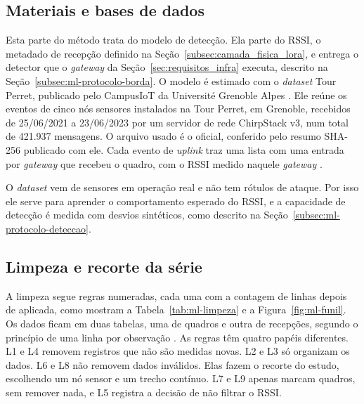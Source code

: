 \subsection{Materiais e bases de dados}
\label{subsec:ml-dataset}

Esta parte do método trata do modelo de detecção. Ela parte do RSSI, o
metadado de recepção definido na Seção~\ref{subsec:camada_fisica_lora}, e
entrega o detector que o \textit{gateway} da Seção~\ref{sec:requisitos_infra}
executa, descrito na Seção~\ref{subsec:ml-protocolo-borda}. O modelo é estimado
com o \textit{dataset} Tour Perret,
publicado pelo CampusIoT da Université Grenoble Alpes \cite{tourperret_dataset}.
Ele reúne os eventos de cinco nós sensores instalados na Tour Perret, em
Grenoble, recebidos de 25/06/2021 a 23/06/2023 por um servidor de rede
ChirpStack v3, num total de 421.937 mensagens. O arquivo usado é o oficial,
conferido pelo resumo SHA-256 publicado com ele. Cada evento de
\textit{uplink} traz uma lista com uma entrada por \textit{gateway} que recebeu
o quadro, com o RSSI medido naquele \textit{gateway} \cite{brocaarintegration}.

O \textit{dataset} vem de sensores em operação real e não tem rótulos de ataque.
Por isso ele serve para aprender o comportamento esperado do RSSI, e a
capacidade de detecção é medida com desvios sintéticos, como descrito na
Seção~\ref{subsec:ml-protocolo-deteccao}.

\subsection{Limpeza e recorte da série}
\label{subsec:ml-limpeza}
\label{sec:selecao_variaveis}

A limpeza segue regras numeradas, cada uma com a contagem de linhas depois de
aplicada, como mostram a Tabela~\ref{tab:ml-limpeza} e a
Figura~\ref{fig:ml-funil}. Os dados ficam em duas tabelas, uma de quadros e
outra de recepções, segundo o princípio de uma linha por observação
\cite{wickham2014tidy}. As regras têm quatro papéis diferentes. L1 e L4 removem
registros que não são medidas novas. L2 e L3 só organizam os dados. L6 e L8 não
removem dados inválidos. Elas fazem o recorte do estudo, escolhendo um nó
sensor e um trecho contínuo. L7 e L9 apenas marcam quadros, sem remover nada, e
L5 registra a decisão de não filtrar o RSSI.

